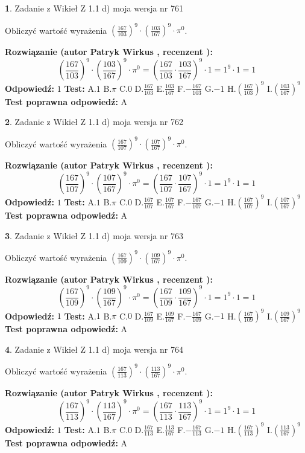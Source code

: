 \documentclass[12pt, a4paper]{article}
\theoremstyle{definition} %
\newtheorem{zad}{}
\newcommand{\zadStart}[1]{\begin{zad}#1\newline}
\newcommand{\zadStop}{\end{zad}}
\newcommand{\rozwStart}[2]{\noindent \textbf{Rozwiązanie (autor #1 , recenzent #2): }\newline}
\newcommand{\rozwStop}{\newline}
\newcommand{\odpStart}{\noindent \textbf{Odpowiedź:}\newline}
\newcommand{\odpStop}{\newline}
\newcommand{\testStart}{\noindent \textbf{Test:}\newline}
\newcommand{\testStop}{\newline}
\newcommand{\kluczStart}{\noindent \textbf{Test poprawna odpowiedź:}\newline}
\newcommand{\kluczStop}{\newline}
\begin{document}
\zadStart{Zadanie z Wikieł Z 1.1 d) moja wersja nr 761}

Obliczyć wartość wyrażenia $(\frac{167}{103})^{9} \cdot (\frac{103}{167})^{9} \cdot \pi^{0}$.
\zadStop
\rozwStart{Patryk Wirkus}{}
$$(\frac{167}{103})^{9} \cdot (\frac{103}{167})^{9} \cdot \pi^{0} = (\frac{167}{103} \cdot \frac{103}{167})^{9} \cdot 1 = 1^{9} \cdot 1 = 1$$
\rozwStop
\odpStart
$1$
\odpStop
\testStart
A.$1$ B.$\pi$ C.$0$ D.$\frac{167}{103}$ E.$\frac{103}{167}$
F.$-\frac{167}{103}$ G.$-1$
H.$(\frac{167}{103})^{9}$
I.$(\frac{103}{167})^{9}$
\testStop
\kluczStart
A
\kluczStop



\zadStart{Zadanie z Wikieł Z 1.1 d) moja wersja nr 762}

Obliczyć wartość wyrażenia $(\frac{167}{107})^{9} \cdot (\frac{107}{167})^{9} \cdot \pi^{0}$.
\zadStop
\rozwStart{Patryk Wirkus}{}
$$(\frac{167}{107})^{9} \cdot (\frac{107}{167})^{9} \cdot \pi^{0} = (\frac{167}{107} \cdot \frac{107}{167})^{9} \cdot 1 = 1^{9} \cdot 1 = 1$$
\rozwStop
\odpStart
$1$
\odpStop
\testStart
A.$1$ B.$\pi$ C.$0$ D.$\frac{167}{107}$ E.$\frac{107}{167}$
F.$-\frac{167}{107}$ G.$-1$
H.$(\frac{167}{107})^{9}$
I.$(\frac{107}{167})^{9}$
\testStop
\kluczStart
A
\kluczStop



\zadStart{Zadanie z Wikieł Z 1.1 d) moja wersja nr 763}

Obliczyć wartość wyrażenia $(\frac{167}{109})^{9} \cdot (\frac{109}{167})^{9} \cdot \pi^{0}$.
\zadStop
\rozwStart{Patryk Wirkus}{}
$$(\frac{167}{109})^{9} \cdot (\frac{109}{167})^{9} \cdot \pi^{0} = (\frac{167}{109} \cdot \frac{109}{167})^{9} \cdot 1 = 1^{9} \cdot 1 = 1$$
\rozwStop
\odpStart
$1$
\odpStop
\testStart
A.$1$ B.$\pi$ C.$0$ D.$\frac{167}{109}$ E.$\frac{109}{167}$
F.$-\frac{167}{109}$ G.$-1$
H.$(\frac{167}{109})^{9}$
I.$(\frac{109}{167})^{9}$
\testStop
\kluczStart
A
\kluczStop



\zadStart{Zadanie z Wikieł Z 1.1 d) moja wersja nr 764}

Obliczyć wartość wyrażenia $(\frac{167}{113})^{9} \cdot (\frac{113}{167})^{9} \cdot \pi^{0}$.
\zadStop
\rozwStart{Patryk Wirkus}{}
$$(\frac{167}{113})^{9} \cdot (\frac{113}{167})^{9} \cdot \pi^{0} = (\frac{167}{113} \cdot \frac{113}{167})^{9} \cdot 1 = 1^{9} \cdot 1 = 1$$
\rozwStop
\odpStart
$1$
\odpStop
\testStart
A.$1$ B.$\pi$ C.$0$ D.$\frac{167}{113}$ E.$\frac{113}{167}$
F.$-\frac{167}{113}$ G.$-1$
H.$(\frac{167}{113})^{9}$
I.$(\frac{113}{167})^{9}$
\testStop
\kluczStart
A
\kluczStop
\end{document}
